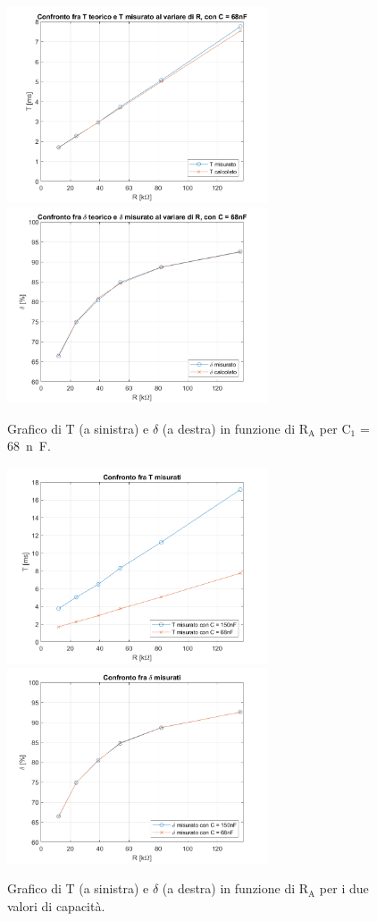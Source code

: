 \documentclass{report}
\begin{document}
\begin{figure}[h!]
	\centering
	\includegraphics[height=5.8cm]{immagini/graficoT2}
	\includegraphics[height=5.8cm]{immagini/graficoDC2}
	\caption{Grafico di T (a sinistra) e $\delta$ (a destra) in funzione di $\mathrm{R_A}$ per $\mathrm{C_1}$ = \SI{68}{n\farad}.}
	\label{figura:graficiC2}
\end{figure}
\begin{figure}[h!]
	\centering
	\includegraphics[height=5.8cm]{immagini/graficoConfrontoT}
	\includegraphics[height=5.8cm]{immagini/graficoConfrontoDC}
	\caption{Grafico di T (a sinistra) e $\delta$ (a destra) in funzione di $\mathrm{R_A}$ per i due valori di capacità.}
	\label{figura:graficiC12}
\end{figure}
\newpage
\end{document}
